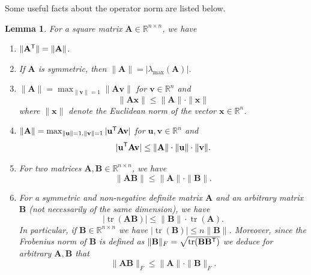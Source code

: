 \documentclass[MAL,biber]{nowfnt} %
\newtheorem{Lemma}{Lemma}
\newcommand{\T}{{\sf T}}
\DeclareMathOperator{\tr}{tr}
\newcommand{\A}{{\mathbf{A}}}
\newcommand{\B}{{\mathbf{B}}}
\newcommand{\uu}{{\mathbf{u}}}
\renewcommand{\v}{{\mathbf{v}}}
\newcommand{\x}{{\mathbf{x}}}
\newcommand{\RR}{{\mathbb{R}}}
\begin{document}
Some useful facts about the operator norm are listed below.
\begin{Lemma}
For a square matrix $\A \in \RR^{n \times n}$, we have
\begin{enumerate}
	\item $\| \A^\T \| = \| \A \|$.
	\item If $\A$ is symmetric, then $\| \A \| = |\lambda_{\max} (\A)|$.
	\item $\| \A \| = \max_{\|\v\| = 1} \| \A \v\|$ for $\v \in \RR^n$ and 
	\[
		\| \A \x \| \le \| \A \| \cdot \|\x\|
	\]
	where $\| \x \|$ denote the Euclidean norm of the vector $\x \in \RR^n$.
	\item $\| \A \| = \max_{\| \uu \| = 1, \|\v\| = 1} |\uu^\T \A \v|$ for $\uu,\v \in \RR^n$ and 
	\[
		|\uu^\T \A \v | \le \| \A \| \cdot \|\uu\| \cdot \| \v \|.
	\]
	\item For two matrices $\A, \B \in \RR^{n \times n}$, we have
	\[
		\| \A \B \| \le \| \A \| \cdot \| \B \|.
	\]
	\item For a symmetric and non-negative definite matrix $\A$ and an arbitrary matrix $\B$ (not necessarily of the same dimension), we have
	\[
		|\tr(\A \B)| \le \| \B \| \cdot \tr(\A).
	\]
	In particular, if $\B \in \RR^{n \times n}$ we have $|\tr (\B)| \le n \| \B \|$. Moreover, since the Frobenius norm of $\B$ is defined as $\| \B \|_F = \sqrt{\tr (\B \B^\T)}$ we deduce for arbitrary $\A,\B$ that
	\[
		\| \A \B \|_F \le \| \A \| \cdot \| \B \|_F.
	\]
\end{enumerate}
\end{Lemma}

\backmatter  %

\printbibliography
\end{document}
